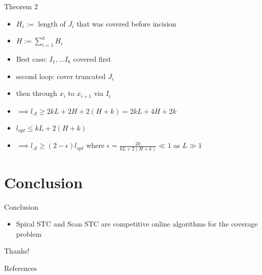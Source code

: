 \documentclass{beamer}
\begin{document}
\begin{frame}{Theorem 2}
    \begin{itemize}
        \item $H_i := $ length of $J_i$ that was covered before incision
        \item $H := \sum_{i = 1}^{k} H_i$
        \item Best case: $I_1, ... I_k$ covered first
        \item second loop: cover truncated $J_i$
        \item then through $x_i$ to $x_{i+1}$ via $I_i$
        \item $\implies l_{\mathcal{A}} \geq 2kL + 2H + 2(H + k) = 2kL + 4H + 2k$
        \item $l_{opt} \leq kL + 2(H + k)$
        \item $\implies l_{\mathcal{A}} \geq (2 - \epsilon) l_{opt}$ where $\epsilon = \frac{2k}{kL + 2(H + k)} \ll 1$ as $L \gg 1$
    \end{itemize}
\end{frame}

\section{Conclusion}
\begin{frame}{Conclusion}
    \begin{itemize}
        \item Spiral STC and Scan STC are competitive online algorithms for the coverage problem
    \end{itemize}
\end{frame}

\begin{frame}[focus]
    Thanks!
\end{frame}


\appendix

\begin{frame}{References}
    \nocite{*} %
    
    
\end{frame}



\end{document}
